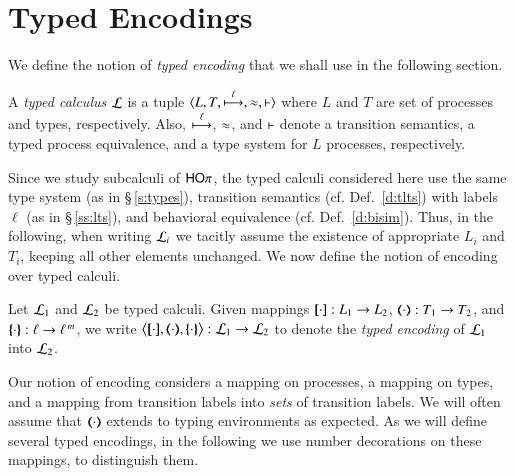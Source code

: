 \section{Typed Encodings}\label{s:expr}

We define the notion of \emph{typed encoding} that we
shall use in the following section.

\begin{definition}\label{d:tcalculus}\rm
	A \emph{typed calculus} $\mathcal{L}$ is a tuple
$		\langle L, T, \stackrel{\ell}{\longmapsto}, \approx, \vdash \rangle$
	where $L$ and $T$ are set of processes and types, respectively.
	Also, $\stackrel{\ell}{\longmapsto}$, $\approx$, and $\vdash$ 
	denote a transition semantics, a typed process equivalence, and a type system for $L$ processes, respectively. 
\end{definition}

Since we study subcalculi of $\mathsf{HO}\pi$, 
the typed calculi considered here 
use the same 
  type system (as in \S\,\ref{s:types}),
 transition semantics (cf. Def.~\ref{d:tlts}) with labels $\ell$ (as in  \S\,\ref{ss:lts}), 
 and behavioral equivalence (cf. Def.~\ref{d:bisim}). 
  Thus, in the following, when writing $\mathcal{L}_i$ we tacitly assume the existence of appropriate 
  $L_i$ and $T_i$, keeping all other elements unchanged.
 We now define the notion of encoding over typed calculi.

\begin{definition}\rm
	Let  $\mathcal{L}_1$ %
	and $\mathcal{L}_2$ %
	be typed calculi. %
	Given mappings $[\!\![\cdot]\!\!]: L_1 \to L_2$, 
	$(\!\!\langle\cdot\rangle\!\!): T_1 \to T_2$, and 
	$\{\!\!\{\cdot\}\!\!\}: \ell \to \ell^{\,m}$, 
	we write 
	$\enco{\map{\cdot}, \mapt{\cdot}, \mapa{\cdot}} : \tyl{L}_1 \to \tyl{L}_2$
	to denote the \emph{typed encoding} of $\mathcal{L}_1$ into $\mathcal{L}_2$.
\end{definition}

Our notion of encoding considers a mapping on processes, 
a mapping on types, %
and a mapping %
from transition labels 
into \emph{sets} of transition labels.
We will often assume that  $(\!\!\langle\cdot\rangle\!\!)$ extends to typing environments as expected.
As we will define several typed encodings,  
in the following we use number decorations on these mappings, to distinguish them.






